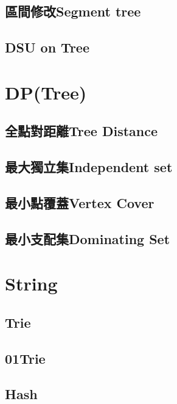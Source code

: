 \subsection{區間修改Segment tree}


\subsection{DSU on Tree}




\section{DP(Tree)}

\subsection{全點對距離Tree Distance}


\subsection{最大獨立集Independent set}


\subsection{最小點覆蓋Vertex Cover}


\subsection{最小支配集Dominating Set}


\section{String}

\subsection{Trie}


\subsection{01Trie}


\subsection{Hash}


